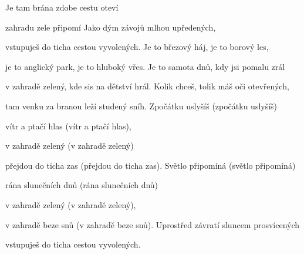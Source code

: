 

\zs
Je tam brána zdobe cestu oteví

zahradu zele  připomí
\ks
\zs
Jako dým závojů mlhou upředených,

vstupuješ do ticha cestou vyvolených.
\ks
\zs
Je to březový háj, je to borový les,

je to anglický park, je to hluboký vřes.
\ks
\zs
Je to samota dnů, kdy jsi pomalu zrál

v zahradě zelený, kde sis na dětství hrál.
\ks
\zs
Kolik chceš, tolik máš oči otevřených,

tam venku za branou leží studený sníh.
\ks
\zs
Zpočátku uslyšíš (zpočátku uslyšíš)

vítr a ptačí hlas (vítr a ptačí hlas),

v zahradě zelený (v zahradě zelený)

přejdou do ticha zas (přejdou do ticha zas).
\ks
\zs
Světlo připomíná (světlo připomíná)

rána slunečních dnů (rána slunečních dnů)

v zahradě zelený (v zahradě zelený),

v zahradě beze snů (v zahradě beze snů).
\ks
\zs
Uprostřed závratí sluncem prosvícených

vstupuješ do ticha cestou vyvolených.
\ks
\kp






















